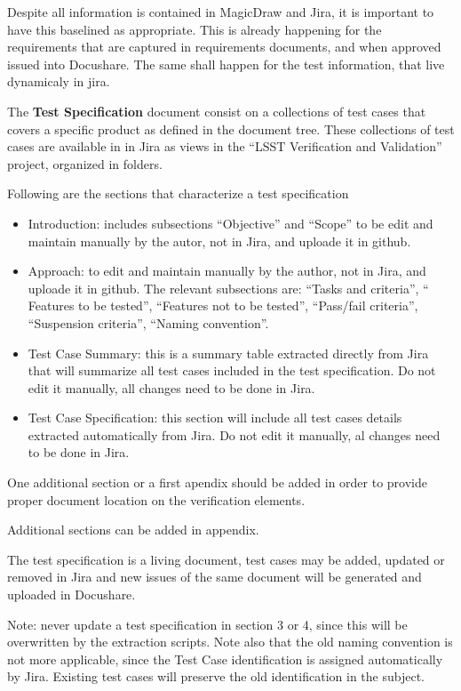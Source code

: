 Despite all information is contained in MagicDraw and Jira, it is important to have this baselined as appropriate. This is already happening for the requirements that are captured in requirements documents, and when approved issued into Docushare.
The same shall happen for the test information, that live dynamicaly in jira.

The {\bf Test Specification} document consist on a collections of test cases that covers a specific \product{} product as defined in the document tree. These collections of test cases are available in in Jira as views in the ``LSST Verification and Validation'' project, organized in folders.

Following are the sections that characterize a test specification

\begin{itemize}
\item Introduction: includes subsections ``Objective'' and ``Scope'' to be edit and maintain manually by the autor, not in Jira, and uploade it in github.
\item Approach: to edit and maintain manually by the author, not in Jira, and uploade it in github. The relevant subsections are: ``Tasks and criteria'', `` Features to be tested'', ``Features not to be tested'', ``Pass/fail criteria'', ``Suspension criteria'', ``Naming convention''.
\item Test Case Summary: this is a summary table extracted directly from Jira that will summarize all test cases included in the test specification. Do not edit it manually, all changes need to be done in Jira.
\item Test Case Specification: this section will include all test cases details extracted automatically from Jira. Do not edit it manually, al changes need to be done in Jira.
\end{itemize}

One additional section or a first apendix should be added in order to provide proper document location on the verification elements.

Additional sections can be added in appendix.

The test specification is a living document, test cases may be added, updated or removed in Jira and new issues of the same document will be generated and uploaded in Docushare.

Note: never update a test specification in section 3 or 4, since this will be overwritten by the extraction scripts. Note also that the old naming convention is not more applicable, since the Test Case identification is assigned automatically by Jira. Existing test cases will preserve the old identification in the subject.


